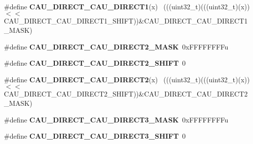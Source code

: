 \begin{DoxyCompactItemize}
\item 
\hypertarget{group___c_a_u___register___masks_ga9ca7df23311b90708525552bbbcf0321}{}\#define {\bfseries C\+A\+U\+\_\+\+D\+I\+R\+E\+C\+T\+\_\+\+C\+A\+U\+\_\+\+D\+I\+R\+E\+C\+T1}(x)                            ~(((uint32\+\_\+t)(((uint32\+\_\+t)(x))$<$$<$C\+A\+U\+\_\+\+D\+I\+R\+E\+C\+T\+\_\+\+C\+A\+U\+\_\+\+D\+I\+R\+E\+C\+T1\+\_\+\+S\+H\+I\+F\+T))\&C\+A\+U\+\_\+\+D\+I\+R\+E\+C\+T\+\_\+\+C\+A\+U\+\_\+\+D\+I\+R\+E\+C\+T1\+\_\+\+M\+A\+S\+K)\label{group___c_a_u___register___masks_ga9ca7df23311b90708525552bbbcf0321}

\item 
\hypertarget{group___c_a_u___register___masks_ga1a2d18db12abd15f6bab404f4f36ed50}{}\#define {\bfseries C\+A\+U\+\_\+\+D\+I\+R\+E\+C\+T\+\_\+\+C\+A\+U\+\_\+\+D\+I\+R\+E\+C\+T2\+\_\+\+M\+A\+S\+K}~0x\+F\+F\+F\+F\+F\+F\+F\+Fu\label{group___c_a_u___register___masks_ga1a2d18db12abd15f6bab404f4f36ed50}

\item 
\hypertarget{group___c_a_u___register___masks_ga84f35cfb3852d2a827fa1ad80bfb207f}{}\#define {\bfseries C\+A\+U\+\_\+\+D\+I\+R\+E\+C\+T\+\_\+\+C\+A\+U\+\_\+\+D\+I\+R\+E\+C\+T2\+\_\+\+S\+H\+I\+F\+T}~0\label{group___c_a_u___register___masks_ga84f35cfb3852d2a827fa1ad80bfb207f}

\item 
\hypertarget{group___c_a_u___register___masks_ga07067278320dac4bfff042f40c47c841}{}\#define {\bfseries C\+A\+U\+\_\+\+D\+I\+R\+E\+C\+T\+\_\+\+C\+A\+U\+\_\+\+D\+I\+R\+E\+C\+T2}(x)                            ~(((uint32\+\_\+t)(((uint32\+\_\+t)(x))$<$$<$C\+A\+U\+\_\+\+D\+I\+R\+E\+C\+T\+\_\+\+C\+A\+U\+\_\+\+D\+I\+R\+E\+C\+T2\+\_\+\+S\+H\+I\+F\+T))\&C\+A\+U\+\_\+\+D\+I\+R\+E\+C\+T\+\_\+\+C\+A\+U\+\_\+\+D\+I\+R\+E\+C\+T2\+\_\+\+M\+A\+S\+K)\label{group___c_a_u___register___masks_ga07067278320dac4bfff042f40c47c841}

\item 
\hypertarget{group___c_a_u___register___masks_ga510182cd7a5c184e092fae143ab6b4cd}{}\#define {\bfseries C\+A\+U\+\_\+\+D\+I\+R\+E\+C\+T\+\_\+\+C\+A\+U\+\_\+\+D\+I\+R\+E\+C\+T3\+\_\+\+M\+A\+S\+K}~0x\+F\+F\+F\+F\+F\+F\+F\+Fu\label{group___c_a_u___register___masks_ga510182cd7a5c184e092fae143ab6b4cd}

\item 
\hypertarget{group___c_a_u___register___masks_ga0a9ed1b0b2d909b4c11c6591d4c8425c}{}\#define {\bfseries C\+A\+U\+\_\+\+D\+I\+R\+E\+C\+T\+\_\+\+C\+A\+U\+\_\+\+D\+I\+R\+E\+C\+T3\+\_\+\+S\+H\+I\+F\+T}~0\label{group___c_a_u___register___masks_ga0a9ed1b0b2d909b4c11c6591d4c8425c}


\end{DoxyCompactItemize}
